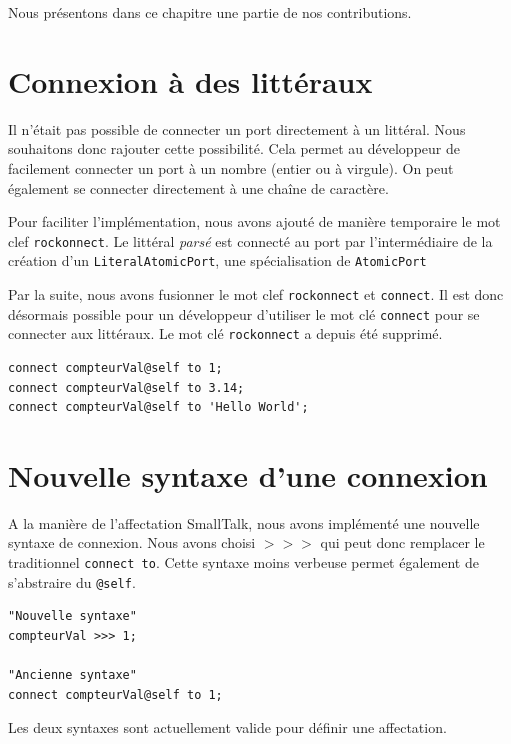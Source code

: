 \documentclass[11pt,a4paper,openany,oneside]{book}
\begin{document}
Nous présentons dans ce chapitre une partie de nos contributions.

\section{Connexion à des littéraux}

Il n'était pas possible de connecter un port directement à un littéral. Nous souhaitons donc rajouter cette possibilité. Cela permet au développeur de facilement connecter un port à un nombre (entier ou à virgule). On peut également se connecter directement à une chaîne de caractère. 

Pour faciliter l'implémentation, nous avons ajouté de manière temporaire le mot clef \texttt{rockonnect}. Le littéral \textit{parsé} est connecté au port par l'intermédiaire de la création d'un \texttt{LiteralAtomicPort}, une spécialisation de \texttt{AtomicPort}

Par la suite, nous avons fusionner le mot clef \texttt{rockonnect} et \texttt{connect}. Il est donc désormais possible pour un développeur d'utiliser le mot clé \texttt{connect} pour se connecter aux littéraux. Le mot clé \texttt{rockonnect} a depuis été supprimé.

\begin{lstlisting}[language=Compo, frame=single, caption=Syntaxe d'une connexion à un littéral]
connect compteurVal@self to 1;
connect compteurVal@self to 3.14;
connect compteurVal@self to 'Hello World';
\end{lstlisting}

\section{Nouvelle syntaxe d'une connexion}

A la manière de l'affectation SmallTalk, nous avons implémenté une nouvelle syntaxe de connexion. Nous avons choisi $>>>$ qui peut donc remplacer le traditionnel \texttt{connect to}. Cette syntaxe moins verbeuse permet également de s'abstraire du \texttt{@self}.

\begin{lstlisting}[language=Compo, frame=single, caption=Comparaison entre l'ancienne et la nouvelle syntaxe d'une connexion]
"Nouvelle syntaxe"
compteurVal >>> 1;

"Ancienne syntaxe"
connect compteurVal@self to 1;
\end{lstlisting}

Les deux syntaxes sont actuellement valide pour définir une affectation.
\end{document}
